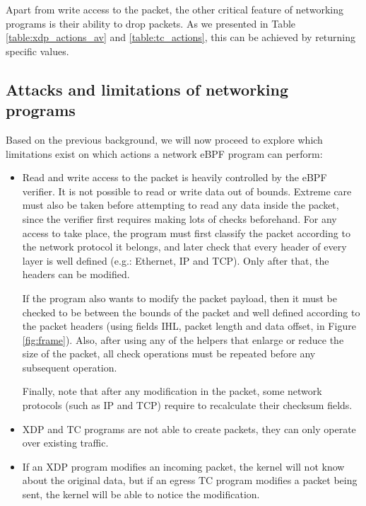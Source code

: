 Apart from write access to the packet, the other critical feature of networking programs is their ability to drop packets. As we presented in Table \ref{table:xdp_actions_av} and \ref{table:tc_actions}, this can be achieved by returning specific values.


\subsection{Attacks and limitations of networking programs} \label{subsection:network_attacks}
Based on the previous background, we will now proceed to explore which limitations exist on which actions a network eBPF program can perform:
\begin{itemize}
\item Read and write access to the packet is heavily controlled by the eBPF verifier. It is not possible to read or write data out of bounds. Extreme care must also be taken before attempting to read any data inside the packet, since the verifier first requires making lots of checks beforehand. For any access to take place, the program must first classify the packet according to the network protocol it belongs, and later check that every header of every layer is well defined (e.g.: Ethernet, IP and TCP). Only after that, the headers can be modified. 

If the program also wants to modify the packet payload, then it must be checked to be between the bounds of the packet and well defined according to the packet headers (using fields IHL, packet length and data offset, in Figure \ref{fig:frame}). Also, after using any of the helpers that enlarge or reduce the size of the packet, all check operations must be repeated before any subsequent operation.

Finally, note that after any modification in the packet, some network protocols (such as IP and TCP) require to recalculate their checksum fields. 

\item XDP and TC programs are not able to create packets, they can only operate over existing traffic.

\item If an XDP program modifies an incoming packet, the kernel will not know about the original data, but if an egress TC program modifies a packet being sent, the kernel will be able to notice the modification.
\end{itemize}


